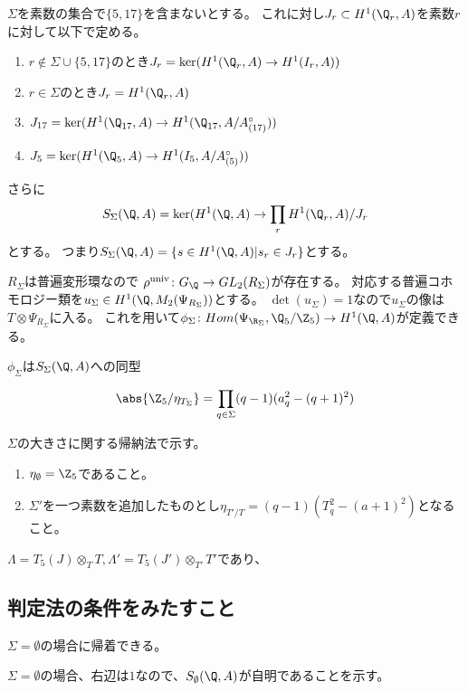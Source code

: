 \documentclass{jsarticle}
\begin{document}
$\Sigma$を素数の集合で$\{5,17\}$を含まないとする。
これに対し$J_r\subset H^1(\Q_r,A)$を素数$r$に対して以下で定める。
\begin{enumerate}
\item $r\notin \Sigma\cup\{5,17\}$のとき$J_r=\ker(H^1(\Q_r,A)\to H^1(I_r,A))$
\item $r\in\Sigma$のとき$J_r=H^1(\Q_r,A)$
\item $J_{17}=\ker(H^1(\Q_{17},A)\to H^1(\Q_{17},A/A^\circ_{(17)}))$
\item $J_5=\ker(H^1(\Q_5,A)\to H^1(I_5,A/A^\circ_{(5)}))$
\end{enumerate}
さらに
\[
S_\Sigma(\Q,A)=\ker(H^1(\Q,A)\to\prod_rH^1(\Q_r,A)/J_r
\]
とする。
つまり$S_\Sigma(\Q,A)=\{s\in H^1(\Q,A)\vert s_r\in J_r\}$とする。

$R_\Sigma$は普遍変形環なので
$\rho^{\rm univ}\colon G_\Q\to GL_2(R_\Sigma)$が存在する。
対応する普遍コホモロジー類を$u_\Sigma\in H^1(\Q,M_2(\Psi_{R_\Sigma}))$とする。
$\det(u_\Sigma)=1$なので$u_\Sigma$の像は$T\otimes\Psi_{R_\Sigma}$に入る。
これを用いて$\phi_\Sigma\colon Hom(\Psi_{\R_\Sigma},\Q_5/\Z_5)\to H^1(\Q,A)$が定義できる。
\begin{prop}
$\phi_\Sigma$は$S_\Sigma(\Q,A)$への同型
\end{prop}

\begin{thm}
\[
\abs{\Z_5/\eta_{T_\Sigma}}=\prod_{q\in\Sigma}(q-1)(a_q^2-(q+1)^2)
\]
\end{thm}
$\Sigma$の大きさに関する帰納法で示す。
\begin{enumerate}
\item $\eta_\emptyset=\Z_5$であること。
\item $\Sigma'$を一つ素数を追加したものとし$\eta_{T'/T}=(q-1)(T_q^2-(a+1)^2)$となること。
\end{enumerate}

$\Lambda=T_5(J)\otimes_{T}T, \Lambda'=T_5(J')\otimes_{T'}T'$であり、

\subsection{判定法の条件をみたすこと}
$\Sigma=\emptyset$の場合に帰着できる。

$\Sigma=\emptyset$の場合、右辺は$1$なので、$S_\emptyset(\Q,A)$が自明であることを示す。
\end{document}
